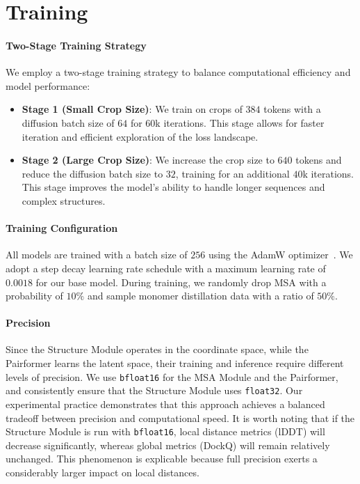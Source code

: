 \documentclass[]{bytedance_seed}
\newcommand{\todoq}[2][]{\todo[size=\scriptsize,color=orange!20!white,#1]{Quanquan: #2}}
\begin{document}


\section{Training}
\label{sec:training}

\paragraph{Two-Stage Training Strategy}
We employ a two-stage training strategy to balance computational efficiency and model performance:

\begin{itemize}
    \item \textbf{Stage 1 (Small Crop Size)}: We train on crops of $384$ tokens with a diffusion batch size of $64$ for $60$k iterations. This stage allows for faster iteration and efficient exploration of the loss landscape.
    \item \textbf{Stage 2 (Large Crop Size)}: We increase the crop size to $640$ tokens and reduce the diffusion batch size to $32$, training for an additional $40$k iterations. This stage improves the model's ability to handle longer sequences and complex structures.
\end{itemize}

\paragraph{Training Configuration}
All models are trained with a batch size of $256$ using the AdamW optimizer~\cite{loshchilov2017decoupled}. We adopt a step decay learning rate schedule with a maximum learning rate of $0.0018$ for our base model. During training, we randomly drop MSA with a probability of $10\%$ and sample monomer distillation data with a ratio of $50\%$. 

\paragraph{Precision} Since the Structure Module operates in the coordinate space, while the Pairformer learns the latent space, their training and inference require different levels of precision. We use \texttt{bfloat16} for the MSA Module and the Pairformer, and consistently ensure that the Structure Module uses \texttt{float32}. Our experimental practice demonstrates that this approach achieves a balanced tradeoff between precision and computational speed. It is worth noting that if the Structure Module is run with \texttt{bfloat16}, local distance metrics (lDDT) will decrease significantly, whereas global metrics (DockQ) will remain relatively unchanged. This phenomenon is explicable because full precision exerts a considerably larger impact on local distances.
\end{document}
